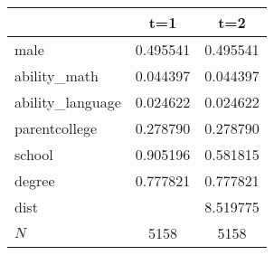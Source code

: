 {
\def\sym#1{\ifmmode^{#1}\else\(^{#1}\)\fi}
\begin{tabular}{l*{2}{c}}
\hline\hline
            &\multicolumn{1}{c}{t=1}&\multicolumn{1}{c}{t=2}\\
\hline
male        &    0.495541&    0.495541\\
ability\_math&    0.044397&    0.044397\\
ability\_language&    0.024622&    0.024622\\
parentcollege&    0.278790&    0.278790\\
school      &    0.905196&    0.581815\\
degree      &    0.777821&    0.777821\\
dist        &            &    8.519775\\
\hline
\(N\)       &        5158&        5158\\
\hline\hline
\end{tabular}
}
